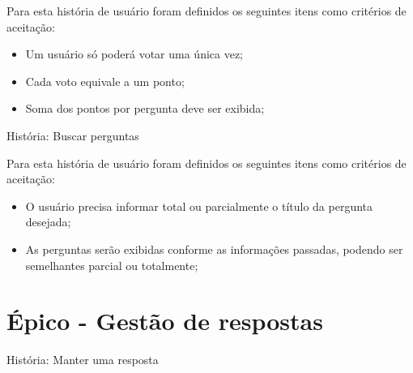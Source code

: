 Para esta história de usuário foram definidos os seguintes itens como critérios de aceitação:

\begin{itemize}
\item Um usuário só poderá votar uma única vez;
\item Cada voto equivale a um ponto;
\item Soma dos pontos por pergunta deve ser exibida;
\end{itemize}

\def\arraystretch{2}
\begin{quadro}[htb]
\centering
\ABNTEXfontereduzida
\caption[História: Buscar perguntas]{História: Buscar perguntas}
\end{quadro}
\FloatBarrier 

Para esta história de usuário foram definidos os seguintes itens como critérios de aceitação:

\begin{itemize}
\item O usuário precisa informar total ou parcialmente o título da pergunta desejada;
\item As perguntas serão exibidas conforme as informações passadas, podendo ser semelhantes parcial ou totalmente;
\end{itemize}

\section{Épico - Gestão de respostas}
\label{gestão_respostas}
\def\arraystretch{2}
\begin{quadro}[htb]
\centering
\ABNTEXfontereduzida
\caption[História: Manter uma resposta]{História: Manter uma resposta}
\end{quadro}
\FloatBarrier 

